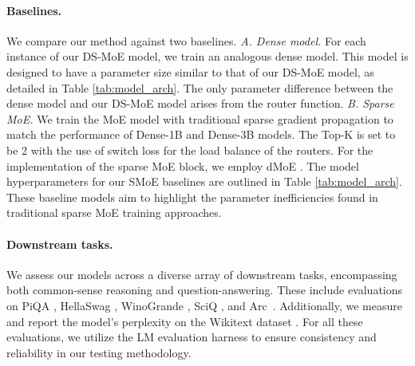 \paragraph{Baselines.} We compare our method against two baselines. \textit{A. Dense model.} For each instance of our DS-MoE model, we train an analogous dense model. This model is designed to have a parameter size similar to that of our DS-MoE model, as detailed in Table \ref{tab:model_arch}. The only parameter difference between the dense model and our DS-MoE model arises from the router function. \textit{B. Sparse MoE.} We train the MoE model with traditional sparse gradient propagation to match the performance of Dense-1B and Dense-3B models. The Top-K is set to be 2 with the use of switch loss \cite{fedus2022switch} for the load balance of the routers. For the implementation of the sparse MoE block, we employ dMoE \cite{gale2023megablocks}. The model hyperparameters for our SMoE baselines are outlined in Table \ref{tab:model_arch}. These baseline models aim to highlight the parameter inefficiencies found in traditional sparse MoE training approaches.

\paragraph{Downstream tasks.} We assess our models across a diverse array of downstream tasks, encompassing both common-sense reasoning and question-answering. These include evaluations on PiQA \cite{bisk2020piqa}, HellaSwag \cite{zellers2019hellaswag}, WinoGrande \cite{sakaguchi2021winogrande}, SciQ \cite{welbl2017crowdsourcing}, and Arc~\cite{allenai:arc}. Additionally, we measure and report the model's perplexity on the Wikitext dataset \cite{wikitext}. For all these evaluations, we utilize the LM evaluation harness \cite{eval-harness} to ensure consistency and reliability in our testing methodology.

